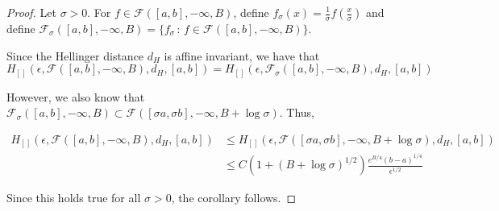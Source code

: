 \documentclass[12pt]{article}
\begin{document}
\begin{proof}

Let $\sigma > 0$. For $f \in \mathcal{F}([a,b], -\infty, B)$, define $f_{\sigma}(x) = \frac{1}{\sigma} f( \frac{x}{\sigma})$ and define $\mathcal{F}_\sigma([a,b], - \infty, B) = \{ f_{\sigma} \,:\, f \in \mathcal{F}([a,b], - \infty, B) \}$. 

Since the Hellinger distance $d_H$ is affine invariant, we have that 
\[
H_{[]}( \epsilon, \mathcal{F}([a,b],-\infty, B), d_H, [a,b]) = H_{[]}( \epsilon, \mathcal{F}_\sigma([a,b],-\infty, B), d_H, [a,b])
\]

However, we also know that  $\mathcal{F}_\sigma([a,b],-\infty, B) \subset \mathcal{F}([\sigma a, \sigma b], -\infty, B + \log \sigma)$. Thus,

\begin{align*}
H_{[]}( \epsilon, \mathcal{F}([a,b],-\infty, B), d_H, [a,b]) &\leq H_{[]}( \epsilon, \mathcal{F}([\sigma a, \sigma b],-\infty, B + \log \sigma), d_H, [a,b])\\
  &\leq C( 1 + (B + \log \sigma)^{1/2}) \frac{ e^{B/4} (b-a)^{1/4}}{\epsilon^{1/2}} 
\end{align*}

Since this holds true for all $\sigma  > 0$, the corollary follows. 

\end{proof}







\end{document}
